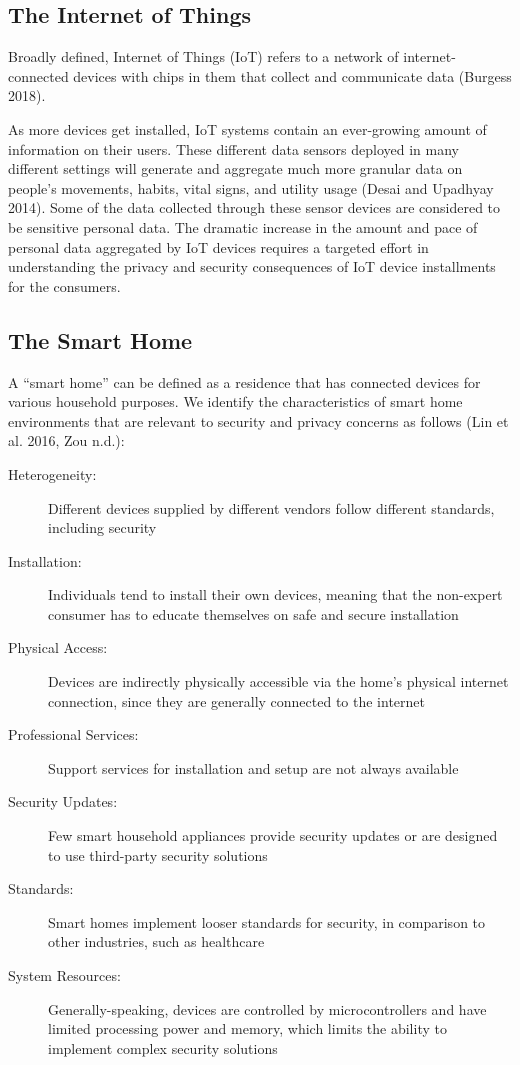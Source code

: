 \subsection{The Internet of Things}

Broadly defined, Internet of Things (IoT) refers to a network of internet-connected devices with chips in them that collect and communicate data (Burgess 2018).

As more devices get installed, IoT systems contain an ever-growing amount of information on their users. These different data sensors deployed in many different settings will generate and aggregate much more granular data on people’s movements, habits, vital signs, and utility usage (Desai and Upadhyay 2014). Some of the data collected through these sensor devices are considered to be sensitive personal data. The dramatic increase in the amount and pace of personal data aggregated by IoT devices requires a targeted effort in understanding the privacy and security consequences of IoT device installments for the consumers.

\subsection{The Smart Home}

A “smart home” can be defined as a residence that has connected devices for various household purposes. We identify the characteristics of smart home environments that are relevant to security and privacy concerns as follows (Lin et al. 2016, Zou n.d.):

\begin{description}
\item [Heterogeneity:] Different devices supplied by different vendors follow different standards, including security
\item [Installation:] Individuals tend to install their own devices, meaning that the non-expert consumer has to educate themselves on safe and secure installation
\item [Physical Access:] Devices are indirectly physically accessible via the home’s physical internet connection, since they are generally connected to the internet
\item [Professional Services:] Support services for installation and setup are not always available
\item [Security Updates:] Few smart household appliances provide security updates or are designed to use third-party  security solutions
\item [Standards:] Smart homes implement looser standards for security, in comparison to other industries, such as healthcare
\item [System Resources:] Generally-speaking, devices are controlled by microcontrollers and have limited processing power and memory, which limits the ability to implement complex security solutions
\end{description}

